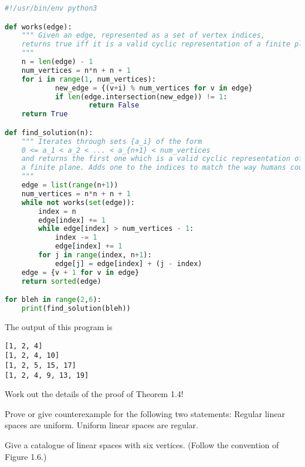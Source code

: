 \documentclass[class=article, crop=false]{standalone}
\begin{document}
\begin{lstlisting}[language=Python]
#!/usr/bin/env python3

def works(edge):
    """ Given an edge, represented as a set of vertex indices,
    returns true iff it is a valid cyclic representation of a finite plane.
    """
    n = len(edge) - 1
    num_vertices = n*n + n + 1
    for i in range(1, num_vertices):
            new_edge = {(v+i) % num_vertices for v in edge}
            if len(edge.intersection(new_edge)) != 1:
                    return False
    return True

def find_solution(n):
    """ Iterates through sets {a_i} of the form
    0 <= a_1 < a_2 < ... < a_{n+1} < num_vertices
    and returns the first one which is a valid cyclic representation of
    a finite plane. Adds one to the indices to match the way humans count.
    """
    edge = list(range(n+1))
    num_vertices = n*n + n + 1
    while not works(set(edge)):
        index = n
        edge[index] += 1
        while edge[index] > num_vertices - 1:
            index -= 1
            edge[index] += 1
        for j in range(index, n+1):
            edge[j] = edge[index] + (j - index)
    edge = {v + 1 for v in edge}
    return sorted(edge)

for bleh in range(2,6):
    print(find_solution(bleh))
\end{lstlisting}

The output of this program is
\begin{verbatim}
[1, 2, 4]
[1, 2, 4, 10]
[1, 2, 5, 15, 17]
[1, 2, 4, 9, 13, 19]
\end{verbatim}

\begin{prob}
    Work out the details of the proof of Theorem 1.4!
\end{prob}

\begin{prob}
    Prove or give counterexample for the following two statements: Regular linear spaces are uniform. Uniform linear spaces are regular.
\end{prob}

\begin{prob}
    Give a catalogue of linear spaces with six vertices. (Follow the convention of Figure 1.6.)
\end{prob}
\end{document}

